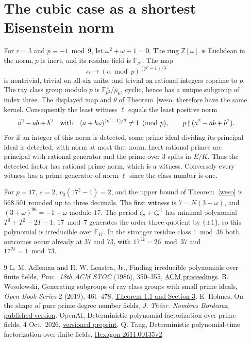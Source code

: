 \documentclass[11pt]{article}
\newcommand{\F}{\mathbb F}
\begin{document}
\section{The cubic case as a shortest Eisenstein norm}
For $r=3$ and $p\equiv-1\bmod9$, let $\omega^2+\omega+1=0$.
The ring $\mathbb Z[\omega]$ is Euclidean in the norm, $p$ is inert,
and its residue field is $\F_{p^2}$. The map
\[
 \alpha\longmapsto (\alpha\bmod p)^{(p^2-1)/3}
\]
is nontrivial, trivial on all six units, and trivial on rational integers
coprime to $p$. The ray class group modulo $p$ is
$\F_{p^2}^{\times}/\mu_6$, cyclic, hence has a unique subgroup of index three.
The displayed map and $\theta$ of Theorem~\ref{weso} therefore have the same kernel.
Consequently the least witness $\ell$ equals the least positive norm
\[
 a^2-ab+b^2\quad\hbox{with}\quad
 (a+b\omega)^{(p^2-1)/3}\ne1\pmod p,\qquad p\nmid(a^2-ab+b^2).
\]
For if an integer of this norm is detected, some prime ideal dividing its
principal ideal is detected, with norm at most that norm. Inert rational primes
are principal with rational generator and the prime over $3$ splits in $E/K$.
Thus the detected factor has rational prime norm, which is a witness. Conversely
every witness has a prime generator of norm $\ell$ since the class number is one.

For $p=17$, $s=2$, $v_3(17^2-1)=2$, and the upper bound of
Theorem~\ref{weso} is $568.501$ rounded up to three decimals.
The first witness is $7=N(3+\omega)$, and $(3+\omega)^{96}=-1-\omega$ modulo $17$.
The period $\zeta_7+\zeta_7^{-1}$ has minimal polynomial
$T^3+T^2-2T-1$; $17\bmod7$ generates the order-three quotient by $\{\pm1\}$,
so this polynomial is irreducible over $\F_{17}$.
In the stronger residue class $1\bmod36$ both outcomes occur already at
$37$ and $73$, with $17^{12}=26\bmod37$ and $17^{24}=1\bmod73$.

\begin{thebibliography}{9}
 L. M. Adleman and H. W. Lenstra, Jr.,
Finding irreducible polynomials over finite fields, \emph{Proc.\ 18th ACM STOC}
(1986), 350--355, \href{https://doi.org/10.1145/12130.12166}{ACM proceedings}.
 B. Wesolowski, Generating subgroups of ray class groups with small
prime ideals, \emph{Open Book Series} 2 (2019), 461--478,
\href{https://msp.org/obs/2019/2-1/obs-v2-n1-p28-s.pdf}{Theorem 1.1 and Section 3}.
 E. Holmes, On the shape of pure prime degree number fields,
\emph{J. Th\'eor. Nombres Bordeaux}, \href{https://doi.org/10.5802/jtnb.1311}{published version}.
 OpenAI, Deterministic polynomial factorization over prime fields,
4 Oct.\ 2026, \href{https://github.com/openai/math/tree/42907c9e999cc00d6abe7a50bfc1023250edd1b9/preprints/Deterministic-Polynomial-Factorization-over-Prime-Fields-October-4-2026}{versioned preprint}.
 Q. Tang, Deterministic polynomial-time factorization over finite
fields, \href{https://hexagonmath.org/2611.00135v2}{Hexagon 2611.00135v2}.
\end{thebibliography}
\end{document}

